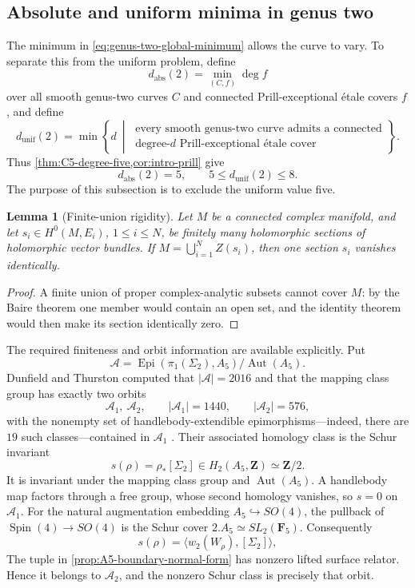 \documentclass[11pt,reqno]{amsart}
\numberwithin{equation}{section}
\newtheorem{lemma}[lemma]{Lemma}
\theoremstyle{remark}
\newcommand{\bZ}{\mathbf Z}
\begin{document}
\subsection{Absolute and uniform minima in genus two}

The minimum in \eqref{eq:genus-two-global-minimum} allows the curve to
vary.  To separate this from the uniform problem, define
\[
 d_{\mathrm{abs}}(2)=
 \min_{(C,f)}\deg f
\]
over all smooth genus-two curves \(C\) and connected Prill-exceptional
\'etale covers \(f\), and define
\[
 d_{\mathrm{unif}}(2)=
 \min\left\{d\ \middle|\
 \begin{array}{c}
 \text{every smooth genus-two curve admits a connected}\\
 \text{degree-\(d\) Prill-exceptional \'etale cover}
 \end{array}\right\}.
\tag{6.38}\label{eq:absolute-uniform-definitions}
\]
Thus \cref{thm:C5-degree-five,cor:intro-prill} give
\[
 d_{\mathrm{abs}}(2)=5,
 \qquad 5\leq d_{\mathrm{unif}}(2)\leq8.
\tag{6.39}\label{eq:initial-uniform-range}
\]
The purpose of this subsection is to exclude the uniform value five.

\begin{lemma}[Finite-union rigidity]\label{lem:finite-union-rigidity}
Let \(M\) be a connected complex manifold, and let
\(s_i\in H^0(M,E_i)\), \(1\leq i\leq N\), be finitely many holomorphic
sections of holomorphic vector bundles.  If
\(M=\bigcup_{i=1}^N Z(s_i)\), then one section \(s_i\) vanishes
identically.
\end{lemma}

\begin{proof}
A finite union of proper complex-analytic subsets cannot cover \(M\):
by the Baire theorem one member would
contain an open set, and the identity theorem would then make its section
identically zero.
\end{proof}

The required finiteness and orbit information are available explicitly.
Put
\[
 \mathcal A=
 \operatorname{Epi}(\pi_1(\Sigma_2),A_5)/\operatorname{Aut}(A_5).
\]
Dunfield and Thurston computed that \(|\mathcal A|=2016\) and that the
mapping class group has exactly two orbits
\[
 \mathcal A_1,\ \mathcal A_2,
 \qquad |\mathcal A_1|=1440,
 \qquad |\mathcal A_2|=576,
\tag{6.40}\label{eq:DT-two-orbits}
\]
with the nonempty set of handlebody-extendible epimorphisms---indeed,
there are \(19\) such classes---contained in
\(\mathcal A_1\) \cite[Example 6.3 and \S6.12]{DunfieldThurston}.
Their associated homology class is the Schur invariant
\[
 s(\rho)=\rho_*[\Sigma_2]\in H_2(A_5,\bZ)\simeq\bZ/2.
\]
It is invariant under the mapping class group and
\(\operatorname{Aut}(A_5)\).  A handlebody map factors through a free
group, whose second homology vanishes, so \(s=0\) on
\(\mathcal A_1\).  For the natural augmentation embedding
\(A_5\hookrightarrow SO(4)\), the pullback of
\(\operatorname{Spin}(4)\to SO(4)\) is the Schur cover
\(2.A_5\simeq SL_2(\mathbf F_5)\).  Consequently
\[
 s(\rho)=\langle w_2(W_\rho),[\Sigma_2]\rangle,
\tag{6.41}\label{eq:Schur-equals-w2}
\]
The tuple in \cref{prop:A5-boundary-normal-form} has nonzero lifted
surface relator.  Hence it belongs to \(\mathcal A_2\), and the nonzero
Schur class is precisely that orbit.
\end{document}
